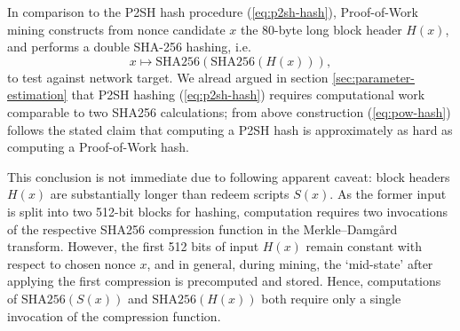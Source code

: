 \documentclass[10pt,a4paper,twocolumn]{article}
\begin{document}
In comparison to the P2SH hash procedure (\ref{eq:p2sh-hash}), Proof-of-Work mining constructs from nonce candidate $x$ the 80-byte long block header $H(x)$, and performs a double SHA-256 hashing, i.e. 
\begin{equation}
    x \mapsto \text{{SHA256}}(\text{{SHA256}}(H(x))),\label{eq:pow-hash}
\end{equation}
to test against network target.
We alread argued in section \ref{sec:parameter-estimation} that P2SH hashing (\ref{eq:p2sh-hash}) requires computational work comparable to two SHA256 calculations; from above construction (\ref{eq:pow-hash}) follows the stated claim that computing a P2SH hash is approximately as hard as computing a Proof-of-Work hash.

This conclusion is not immediate due to following apparent caveat: block headers $H(x)$ are substantially longer than redeem scripts $S(x)$.
As the former input is split into two 512-bit blocks for hashing, computation requires two invocations of the respective {SHA256} compression function in the Merkle–Damgård transform.
However, the first 512 bits of input $H(x)$ remain constant with respect to chosen nonce $x$, and in general, during mining, the \enquote*{mid-state} after applying the first compression is precomputed and stored.
Hence, computations of $\text{{SHA256}}(S(x))$ and $\text{{SHA256}}(H(x))$ both require only a single invocation of the compression function.

\end{document}
